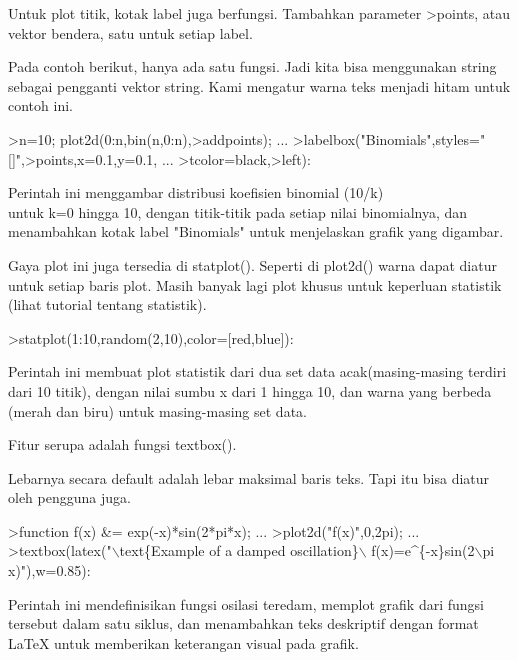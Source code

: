 \documentclass{article}
\begin{document}
\begin{eulernotebook}
\begin{eulercomment}
\begin{eulercomment}
\begin{eulercomment}
\begin{eulercomment}
\begin{eulercomment}
\begin{eulercomment}
\begin{eulercomment}
\begin{eulercomment}
\begin{eulercomment}
Untuk plot titik, kotak label juga berfungsi. Tambahkan parameter
\textgreater{}points, atau vektor bendera, satu untuk setiap label.

Pada contoh berikut, hanya ada satu fungsi. Jadi kita bisa menggunakan
string sebagai pengganti vektor string. Kami mengatur warna teks
menjadi hitam untuk contoh ini.
\end{eulercomment}
\begin{eulerprompt}
>n=10; plot2d(0:n,bin(n,0:n),>addpoints); ...
>labelbox("Binomials",styles="[]",>points,x=0.1,y=0.1, ...
>tcolor=black,>left):
\end{eulerprompt}
\begin{eulercomment}
Perintah ini menggambar distribusi koefisien binomial (10/k)\\
untuk k=0 hingga 10, dengan titik-titik pada setiap nilai binomialnya,
dan menambahkan kotak label "Binomials" untuk menjelaskan grafik yang
digambar.

Gaya plot ini juga tersedia di statplot(). Seperti di plot2d() warna
dapat diatur untuk setiap baris plot. Masih banyak lagi plot khusus
untuk keperluan statistik (lihat tutorial tentang statistik).
\end{eulercomment}
\begin{eulerprompt}
>statplot(1:10,random(2,10),color=[red,blue]):
\end{eulerprompt}
\begin{eulercomment}
Perintah ini membuat plot statistik dari dua set data
acak(masing-masing terdiri dari 10 titik), dengan nilai sumbu x dari 1
hingga 10, dan warna yang berbeda (merah dan biru) untuk masing-masing
set data.

Fitur serupa adalah fungsi textbox().

Lebarnya secara default adalah lebar maksimal baris teks. Tapi itu
bisa diatur oleh pengguna juga.
\end{eulercomment}
\begin{eulerprompt}
>function f(x) &= exp(-x)*sin(2*pi*x); ...
>plot2d("f(x)",0,2pi); ...
>textbox(latex("\(\backslash\)text\{Example of a damped oscillation\}\(\backslash\) f(x)=e^\{-x\}sin(2\(\backslash\)pi x)"),w=0.85):
\end{eulerprompt}
\begin{eulercomment}
Perintah ini mendefinisikan fungsi osilasi teredam, memplot grafik
dari fungsi tersebut dalam satu siklus, dan menambahkan teks
deskriptif dengan format LaTeX untuk memberikan keterangan visual pada
grafik.


\end{eulercomment}
\end{eulercomment}
\end{eulercomment}
\end{eulercomment}
\end{eulercomment}
\end{eulercomment}
\end{eulercomment}
\end{eulercomment}
\end{eulercomment}
\end{eulernotebook}
\end{document}
